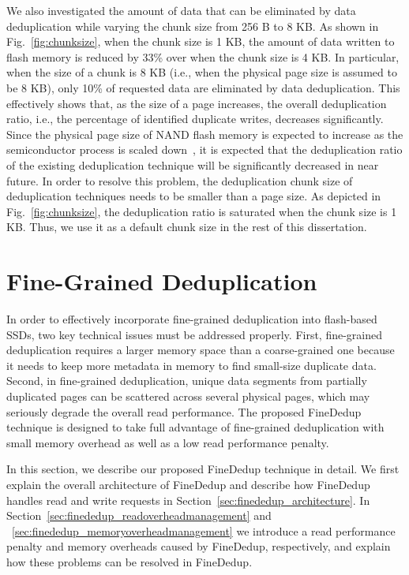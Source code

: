 We also investigated the amount of data that can be eliminated by data deduplication 
while varying the chunk size from 256 B to 8 KB.
As shown in Fig.~\ref{fig:chunksize}, 
when the chunk size is 1 KB, 
the amount of data written to flash memory is reduced by 33\% over when the chunk size is 4 KB.
In particular, when the size of a chunk is 8 KB (i.e., when the physical page size is assumed to be 8 KB),
only 10\% of requested data are eliminated by data deduplication.
This effectively shows that, as the size of a page increases,
the overall deduplication ratio, i.e., the percentage of identified duplicate writes, decreases significantly.
Since the physical page size of NAND flash memory is expected to increase as the semiconductor process is scaled down~\cite{tlc,16kpage},
it is expected that the deduplication ratio of the existing deduplication technique will be significantly 
decreased in near future.
In order to resolve this problem, the deduplication chunk size of deduplication techniques needs to be smaller than a page size.
As depicted in Fig.~\ref{fig:chunksize}, 
the deduplication ratio is saturated when the chunk size is 1 KB.
Thus, we use it as a default chunk size in the rest of this dissertation.

\section{Fine-Grained Deduplication}
\label{sec:finededup_finededup}
In order to effectively incorporate fine-grained deduplication into flash-based SSDs,
two key technical issues must be addressed properly.
First, fine-grained deduplication requires a larger memory space than a coarse-grained one 
because it needs to keep more metadata in memory to find small-size duplicate data.
Second, in fine-grained deduplication, 
unique data segments from partially duplicated pages can be scattered across several physical pages,
which may seriously degrade the overall read performance.
The proposed FineDedup technique is designed to take full advantage of fine-grained deduplication
with small memory overhead as well as a low read performance penalty.

In this section, we describe our proposed FineDedup technique in detail.
We first explain the overall architecture of FineDedup and 
describe how FineDedup handles read and write requests in Section~\ref{sec:finededup_architecture}.
In Section~\ref{sec:finededup_readoverheadmanagement} and ~\ref{sec:finededup_memoryoverheadmanagement}
we introduce a read performance penalty and memory overheads caused by FineDedup, respectively,
and explain how these problems can be resolved in FineDedup.

